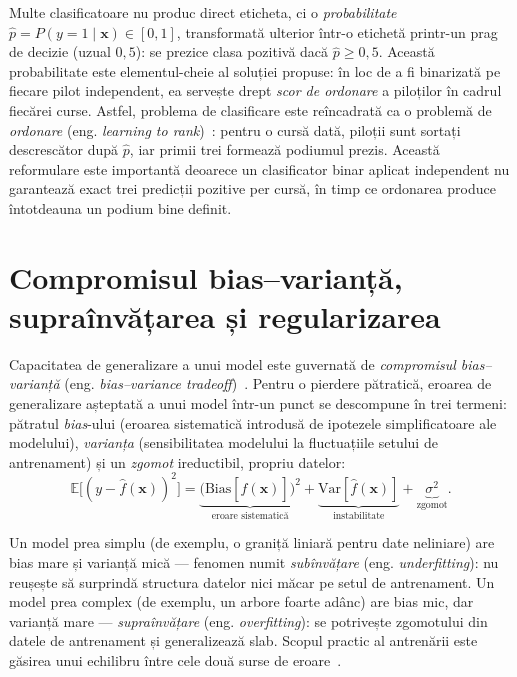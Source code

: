 \documentclass[12pt,a4paper]{report}
\begin{document}
Multe clasificatoare nu produc direct eticheta, ci o \emph{probabilitate}
$\hat{p} = P(y = 1 \mid \mathbf{x}) \in [0, 1]$, transformată ulterior într-o etichetă printr-un
prag de decizie (uzual $0{,}5$): se prezice clasa pozitivă dacă $\hat{p} \geq 0{,}5$. Această
probabilitate este elementul-cheie al soluției propuse: în loc de a fi binarizată pe fiecare
pilot independent, ea servește drept \emph{scor de ordonare} a piloților în cadrul fiecărei
curse. Astfel, problema de clasificare este reîncadrată ca o problemă de
\emph{ordonare} (eng. \emph{learning to rank})~\cite{liu2009learning}: pentru o cursă dată,
piloții sunt sortați descrescător după $\hat{p}$, iar primii trei formează podiumul prezis.
Această reformulare este importantă deoarece un clasificator binar aplicat independent nu
garantează exact trei predicții pozitive per cursă, în timp ce ordonarea produce întotdeauna un
podium bine definit.

\section{Compromisul bias--varianță, supraînvățarea și regularizarea}
\label{sec:biasvar}

Capacitatea de generalizare a unui model este guvernată de \emph{compromisul bias--varianță}
(eng. \emph{bias--variance tradeoff})~\cite{geman1992neural, hastie2009elements}. Pentru o
pierdere pătratică, eroarea de generalizare așteptată a unui model într-un punct se descompune în
trei termeni: pătratul \emph{bias}-ului (eroarea sistematică introdusă de ipotezele simplificatoare
ale modelului), \emph{varianța} (sensibilitatea modelului la fluctuațiile setului de antrenament)
și un \emph{zgomot} ireductibil, propriu datelor:
\begin{equation}
  \mathbb{E}\big[(y - \hat{f}(\mathbf{x}))^2\big] =
  \underbrace{\big(\text{Bias}[\hat{f}(\mathbf{x})]\big)^2}_{\text{eroare sistematică}} +
  \underbrace{\text{Var}[\hat{f}(\mathbf{x})]}_{\text{instabilitate}} +
  \underbrace{\sigma^2}_{\text{zgomot}}.
  \label{eq:biasvar}
\end{equation}

Un model prea simplu (de exemplu, o graniță liniară pentru date neliniare) are bias mare și
varianță mică --- fenomen numit \emph{subînvățare} (eng. \emph{underfitting}): nu reușește să
surprindă structura datelor nici măcar pe setul de antrenament. Un model prea complex (de
exemplu, un arbore foarte adânc) are bias mic, dar varianță mare --- \emph{supraînvățare} (eng.
\emph{overfitting}): se potrivește zgomotului din datele de antrenament și generalizează slab.
Scopul practic al antrenării este găsirea unui echilibru între cele două surse de
eroare~\cite{james2013introduction}.
\end{document}

